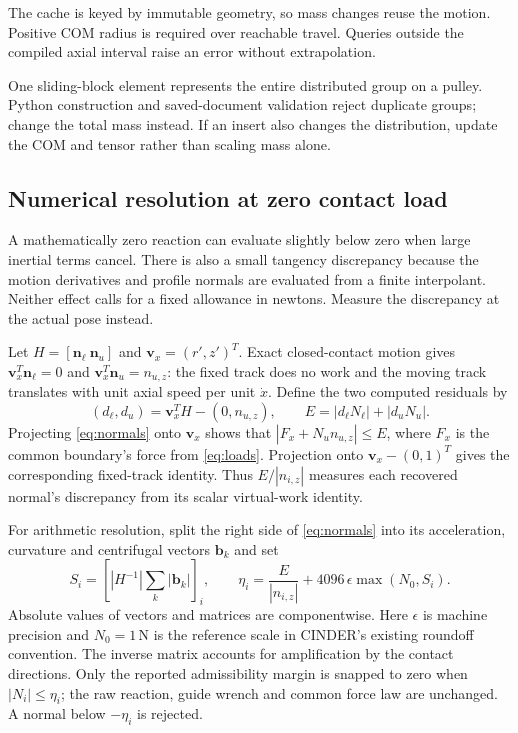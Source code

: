 \documentclass[11pt,letterpaper]{article}
\numberwithin{equation}{section}
\begin{document}
The cache is keyed by immutable geometry, so mass changes reuse the motion.
Positive COM radius is required over reachable travel. Queries outside the
compiled axial interval raise an error without extrapolation.

One sliding-block element represents the entire distributed group on a pulley.
Python construction and saved-document validation reject duplicate groups;
change the total mass instead. If an insert also changes the distribution,
update the COM and tensor rather than scaling mass alone.

\subsection{Numerical resolution at zero contact load}

A mathematically zero reaction can evaluate slightly below zero when large
inertial terms cancel. There is also a small tangency discrepancy because the
motion derivatives and profile normals are evaluated from a finite interpolant.
Neither effect calls for a fixed allowance in newtons. Measure the discrepancy
at the actual pose instead.

Let $H=[\bm n_\ell\ \bm n_u]$ and $\bm v_x=(r',z')^T$. Exact closed-contact
motion gives $\bm v_x^T\bm n_\ell=0$ and
$\bm v_x^T\bm n_u=n_{u,z}$: the fixed track does no work and the moving
track translates with unit axial speed per unit $\dot x$. Define the two
computed residuals by
\begin{equation}
 (d_\ell,d_u)=\bm v_x^T H-(0,n_{u,z}),\qquad
 E=|d_\ell N_\ell|+|d_u N_u|.
 \label{eq:work-residual}
\end{equation}
Projecting \cref{eq:normals} onto $\bm v_x$ shows that
$|F_x+N_u n_{u,z}|\leq E$, where $F_x$ is the common boundary's force
from \cref{eq:loads}. Projection onto $\bm v_x-(0,1)^T$ gives the
corresponding fixed-track identity. Thus $E/|n_{i,z}|$ measures each recovered
normal's discrepancy from its scalar virtual-work identity.

For arithmetic resolution, split the right side of \cref{eq:normals} into
its acceleration, curvature and centrifugal vectors $\bm b_k$ and set
\begin{equation}
 S_i=\left[|H^{-1}|\sum_k|\bm b_k|\right]_i,\qquad
 \eta_i=\frac{E}{|n_{i,z}|}
       +4096\,\epsilon\max(N_0,S_i).
 \label{eq:normal-resolution}
\end{equation}
Absolute values of vectors and matrices are componentwise. Here $\epsilon$
is machine precision and $N_0=1\,\mathrm N$ is the reference scale in CINDER's
existing roundoff convention. The inverse matrix accounts for amplification
by the contact directions. Only the reported admissibility margin is snapped
to zero when $|N_i|\leq\eta_i$; the raw reaction, guide wrench and common
force law are unchanged. A normal below $-\eta_i$ is rejected.
\end{document}
